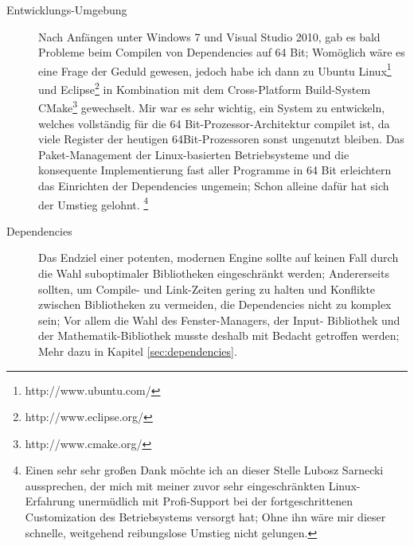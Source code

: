 \begin{description}

	\item[Entwicklungs-Umgebung]
	Nach Anfängen unter Windows 7 und Visual Studio 2010, gab es bald Probleme beim Compilen von Dependencies auf 
	64 Bit; Womöglich wäre es eine Frage der Geduld gewesen, jedoch habe ich dann zu 
	Ubuntu Linux\footnote{http://www.ubuntu.com/} und Eclipse\footnote{http://www.eclipse.org/} in 
	Kombination mit dem Cross-Platform Build-System CMake\footnote{http://www.cmake.org/} gewechselt. Mir war es sehr 	
	wichtig, ein System zu entwickeln, welches vollständig für die 64 Bit-Prozessor-Architektur compilet ist, da viele 
	Register der heutigen 64Bit-Prozessoren sonst ungenutzt bleiben.
	Das Paket-Management der Linux-basierten Betriebsysteme und die konsequente Implementierung fast aller Programme in 64 
	Bit erleichtern das Einrichten der Dependencies ungemein; Schon alleine dafür hat sich der Umstieg 
	gelohnt.
	\footnote{Einen sehr sehr großen Dank möchte ich an dieser Stelle Lubosz Sarnecki aussprechen, der mich mit 
	meiner zuvor sehr eingeschränkten Linux-Erfahrung unermüdlich mit Profi-Support bei der fortgeschrittenen Customization 
	des Betriebsystems versorgt hat; Ohne ihn wäre mir dieser schnelle, weitgehend reibungslose Umstieg nicht gelungen.}

	\item[Dependencies]
	Das Endziel einer potenten, modernen Engine sollte auf keinen Fall durch die Wahl suboptimaler Bibliotheken 
	eingeschränkt werden; Andererseits sollten, um Compile- und Link-Zeiten gering zu halten und Konflikte zwischen 
	Bibliotheken zu vermeiden, die Dependencies nicht zu komplex sein; Vor allem die Wahl des Fenster-Managers, der Input-
	Bibliothek und der Mathematik-Bibliothek musste deshalb mit Bedacht getroffen werden; Mehr dazu in Kapitel 
	\ref{sec:dependencies}.
	
	
	

\end{description}
